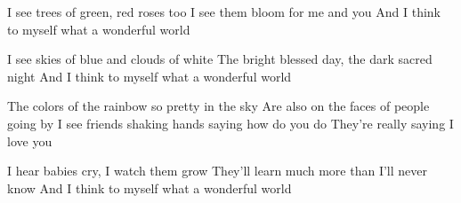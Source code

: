 \IncludeLilypond

\vfil\break

I see trees of green, red roses too
I see them bloom for me and you
And I think to myself what a wonderful world

I see skies of blue and clouds of white
The bright blessed day, the dark sacred night
And I think to myself what a wonderful world

The colors of the rainbow so pretty in the sky
Are also on the faces of people going by
I see friends shaking hands saying how do you do
They're really saying I love you

I hear babies cry, I watch them grow
They'll learn much more than I'll never know
And I think to myself what a wonderful world

